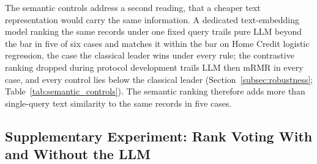 \documentclass[final,5p,twocolumn]{elsarticle}
\begin{document}
The semantic controls address a second reading, that a cheaper text representation would carry the same information. A dedicated text-embedding model ranking the same records under one fixed query trails pure LLM beyond the bar in five of six cases and matches it within the bar on Home Credit logistic regression, the case the classical leader wins under every rule; the contrastive ranking dropped during protocol development trails LLM then mRMR in every case, and every control lies below the classical leader (Section~\ref{subsec:robustness}; Table~\ref{tab:semantic_controls}). The semantic ranking therefore adds more than single-query text similarity to the same records in five cases.

\subsection{Supplementary Experiment: Rank Voting With and Without the LLM}
\label{subsec:supplementary_discussion}
\end{document}
